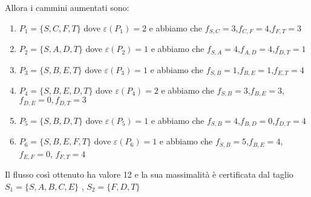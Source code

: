 \documentclass[10pt,a4paper,titlepage]{article}
\theoremstyle{break}
\theoremstyle{break}
\theoremstyle{break}
\begin{document}
\begin{enumerate}

Allora i cammini aumentati sono:
\begin{enumerate}
\item $P_1 = \lbrace S,C,F,T \rbrace$ dove $\varepsilon(P_1) = 2$ e abbiamo che $f_{S,C}=3$,$f_{C,F}=4$,$f_{F,T}=3$
\item $P_2 = \lbrace S,A,D,T \rbrace$ dove $\varepsilon(P_2) = 1$ e abbiamo che $f_{S,A}=4$,$f_{A,D}=4$,$f_{D,T}=1$
\item $P_3 = \lbrace S,B,E,T \rbrace$ dove $\varepsilon(P_3) = 1$ e abbiamo che $f_{S,B}=1$,$f_{B,E}=1$,$f_{E,T}=4$
\item $P_4 = \lbrace S,B,E,D,T \rbrace$ dove $\varepsilon(P_4) = 2$ e abbiamo che $f_{S,B}=3$,$f_{B,E}=3$,$f_{D,E}=0,f_{D,T}=3 $
\item $P_5 = \lbrace S,B,D,T \rbrace$ dove $\varepsilon(P_5) = 1$ e abbiamo che $f_{S,B}=4$,$f_{B,D}=0$,$f_{D,T}=4$
\item $P_6 = \lbrace S,B,E,F,T \rbrace$ dove $\varepsilon(P_6) = 1$ e abbiamo che $f_{S,B}=5$,$f_{B,E}=4$,$f_{E,F}=0$, $f_{F,T}=4$
\end{enumerate}

Il flusso così ottenuto ha valore 12 e la sua massimalità è certificata dal taglio $S_1 = \lbrace S, A, B, C, E \rbrace$ , $S_2 = \lbrace F,D,T \rbrace$



\end{enumerate}
\end{document}
